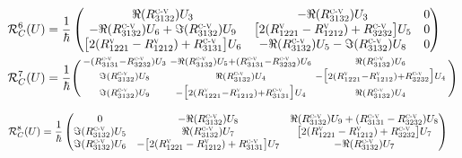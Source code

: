 \documentclass[12pt,a4paper,openany,oneside]{book}
\begin{document}
{{{{{{\begin{eqnarray*}
\begin{split}
\mathcal{R}^{6}_{C}(U)&= \dfrac{1}{\hbar}
\begin{pmatrix}
\Re(R^{\textsc{c-v}}_{3132})U_{3} & -\Re(R^{\textsc{c-v}}_{3132})U_{3} & 0 \\
-\Re(R^{\textsc{c-v}}_{3132})U_{6}+\Im(R^{\textsc{c-v}}_{3132})U_{9} & \big[2(R^{\textsc{v}}_{1221}-R^{\textsc{v}}_{1212})+R^{\textsc{c-v}}_{3232}\big]U_{5} & 0 \\
\big[2(R^{\textsc{v}}_{1221}-R^{\textsc{v}}_{1212})+R^{\textsc{c-v}}_{3131}\big]U_{6} & -\Re(R^{\textsc{c-v}}_{3132})U_{5}- \Im(R^{\textsc{c-v}}_{3132})U_{8} & 0 
\end{pmatrix}\\
\mathcal{R}^{7}_{C}(U)&= \dfrac{1}{\hbar}
\Bigg(\begin{smallmatrix}
-(R^{\textsc{c-v}}_{3131}-R^{\textsc{c-v}}_{3232})U_{3} & -\Re(R^{\textsc{c-v}}_{3132})U_{5}
 +(R^{\textsc{c-v}}_{3131}-R^{\textsc{c-v}}_{3232})U_{6} &  \Re(R^{\textsc{c-v}}_{3132})U_{6}\\
\Im(R^{\textsc{c-v}}_{3132})U_{8} & \Re(R^{\textsc{c-v}}_{3132})U_{4} & -\big[2(R^{\textsc{v}}_{1221}-R^{\textsc{v}}_{1212})+R^{\textsc{c-v}}_{3232}\big]U_{4}\\
\Im(R^{\textsc{c-v}}_{3132})U_{9} & -\big[2(R^{\textsc{v}}_{1221}-R^{\textsc{v}}_{1212})+R^{\textsc{c-v}}_{3131}\big]U_{4} & \Re(R^{\textsc{c-v}}_{3132})U_{4} 
\end{smallmatrix}\Bigg)
\end{split}
\end{eqnarray*}

\begin{small}
\begin{eqnarray*}
\begin{split}
\mathcal{R}^{8}_{C}(U)&= \dfrac{1}{\hbar}
\begin{pmatrix}
0 & -\Re(R^{\textsc{c-v}}_{3132})U_{8} & \Re(R^{\textsc{c-v}}_{3132})U_{9}+(R^{\textsc{c-v}}_{3131}-R^{\textsc{c-v}}_{3232})U_{8}\\
\Im(R^{\textsc{c-v}}_{3132})U_{5} & \Re(R^{\textsc{c-v}}_{3132})U_{7} &  \big[2(R^{\textsc{v}}_{1221}-R^{\textsc{v}}_{1212})+R^{\textsc{c-v}}_{3232}\big]U_{7}\\
\Im(R^{\textsc{c-v}}_{3132})U_{6} & -\big[2(R^{\textsc{v}}_{1221}-R^{\textsc{v}}_{1212})+R^{\textsc{c-v}}_{3131}\big]U_{7} & -\Re(R^{\textsc{c-v}}_{3132})U_{7}
\end{pmatrix}
\end{split}
\end{eqnarray*}
\end{small}

}}}}}}
\end{document}
